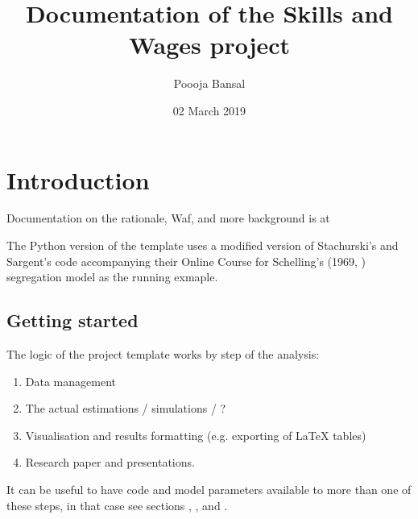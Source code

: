 \documentclass[a4paper,11pt,english]{sphinxmanual}
\title{Documentation of the Skills and Wages project}
\date{02 March 2019}
\author{Poooja Bansal}
\begin{document}
\pagestyle{empty}
\maketitle
\pagestyle{plain}
\sphinxtableofcontents
\pagestyle{normal}
\label{\detokenize{index::doc}}



\chapter{Introduction}
\label{\detokenize{introduction:introduction}}\label{\detokenize{introduction:id1}}\label{\detokenize{introduction::doc}}
Documentation on the rationale, Waf, and more background is at 

The Python version of the template uses a modified version of Stachurski’s and Sargent’s code accompanying their Online Course  for Schelling’s (1969, ) segregation model as the running exmaple.


\section{Getting started}
\label{\detokenize{introduction:getting-started}}\label{\detokenize{introduction:id4}}
  

The logic of the project template works by step of the analysis:
\begin{enumerate}
\def\theenumi{\arabic{enumi}}
\def\labelenumi{\theenumi .}
\makeatletter\def\p@enumii{\p@enumi \theenumi .}\makeatother
\item {} 
Data management

\item {} 
The actual estimations / simulations / ?

\item {} 
Visualisation and results formatting (e.g. exporting of LaTeX tables)

\item {} 
Research paper and presentations.

\end{enumerate}

It can be useful to have code and model parameters available to more than one of these steps, in that case see sections , , and {\hyperref[\detokenize{library:library}]{}}.
\end{document}
